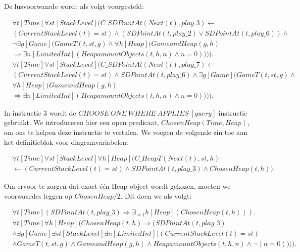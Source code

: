 De lusvoorwaarde wordt als volgt voorgesteld:

\begin{align}
\nonumber &\forall{t}[Time]\forall{st}[StackLevel](C\_SDPointAt(Next(t), play\_3) \leftarrow \\ \nonumber &(CurrentStackLevel(t) = st) \land (SDPointAt(t, play\_2) \lor SDPointAt(t, play\_6)) \land \\ \nonumber &\lnot{}\exists{g}[Game](GameT(t, st, g) \land{}\forall{h}[Heap](GameandHeap(g, h) \\ &\Rightarrow \exists{n}[LimitedInt](HeapamountObjects(t, h, n) \land n = 0)))). \\
\nonumber &\forall{t}[Time]\forall{st}[StackLevel](C\_SDPointAt(Next(t), play\_7) \leftarrow \\ \nonumber &(CurrentStackLevel(t) = st) \land SDPointAt(t, play\_6) \land \exists{g}[Game](GameT(t, st, g) \land \\ \nonumber &\forall{h}[Heap](GameandHeap(g, h) \\ &\Rightarrow \exists{n}[LimitedInt](HeapamountObjects(t, h, n) \land n = 0)))).
\end{align}

In instructie 3 wordt de $CHOOSE\ ONE\ WHERE\ APPLIES\ [query]$ instructie gebruikt. We introduceren hier een open predicaat, $ChosenHeap(Time, Heap)$, om ons te helpen deze instructie te vertalen. We voegen de volgende zin toe aan het definitieblok voor diagramvariabelen:

\begin{align}
\nonumber &\forall{t}[Time]\forall{st}[StackLevel]\forall{h}[Heap](C\_HeapT(Next(t), st, h) \\ &\leftarrow (CurrentStackLevel(t) = st) \land SDPointAt(t, play\_3) \land ChosenHeap(t, h)).
\end{align}

Om ervoor te zorgen dat exact \'e\'en Heap-object wordt gekozen, moeten we voorwaardes leggen op $ChosenHeap/2$. Dit doen we als volgt:

\begin{align}
&\forall{t}[Time](SDPointAt(t, play\_3) \Rightarrow \exists_{=1}{h}[Heap](ChosenHeap(t, h))).\label{form:uniqueheap} \\
\nonumber &\forall{t}[Time]\forall{h}[Heap](ChosenHeap(t, h) \Rightarrow (SDPointAt(t, play\_3) \\ \nonumber &\land \exists{g}[Game]\exists{st}[StackLevel]\exists{n}[LimitedInt]((CurrentStackLevel(t) = st) \\ &\land GameT(t, st, g) \land GameandHeap(g, h) \land HeapamountObjects(t, h, n) \land \lnot(n = 0)))).\label{form:correctsd}
\end{align}

